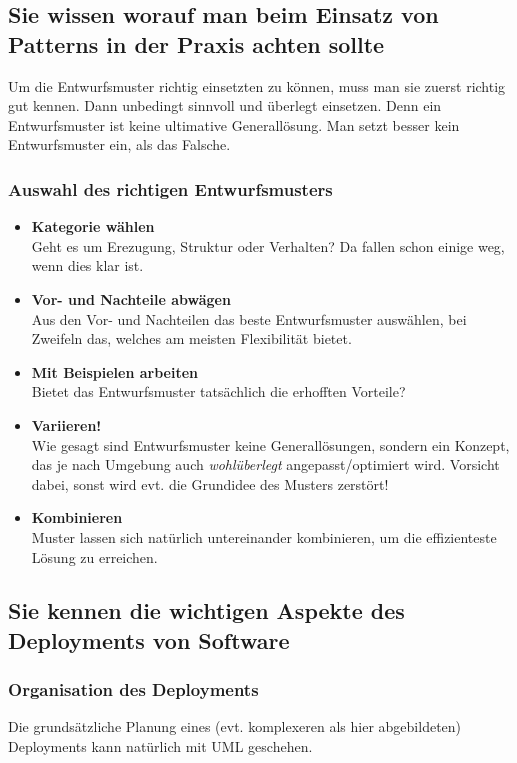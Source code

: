 \subsection{Sie wissen worauf man beim Einsatz von Patterns in der Praxis achten sollte}
Um die Entwurfsmuster richtig einsetzten zu können, muss man sie zuerst richtig gut kennen. Dann unbedingt sinnvoll und überlegt einsetzen. Denn ein Entwurfsmuster ist keine ultimative Generallösung. Man setzt besser kein Entwurfsmuster ein, als das Falsche.

\subsubsection{Auswahl des richtigen Entwurfsmusters}
\begin{itemize}
  \item \textbf{Kategorie wählen} \\
  Geht es um Erezugung, Struktur oder Verhalten? Da fallen schon einige weg, wenn dies klar ist.
  \item \textbf{Vor- und Nachteile abwägen} \\
  Aus den Vor- und Nachteilen das beste Entwurfsmuster auswählen, bei Zweifeln das, welches am meisten Flexibilität bietet.
  \item \textbf{Mit Beispielen arbeiten} \\
  Bietet das Entwurfsmuster tatsächlich die erhofften Vorteile?
  \item \textbf{Variieren!} \\
  Wie gesagt sind Entwurfsmuster keine Generallösungen, sondern ein Konzept, das je nach Umgebung auch \emph{wohlüberlegt} angepasst/optimiert wird. Vorsicht dabei, sonst wird evt. die Grundidee des Musters zerstört!
  \item \textbf{Kombinieren} \\
  Muster lassen sich natürlich untereinander kombinieren, um die effizienteste Lösung zu erreichen. 
\end{itemize}

\subsection{Sie kennen die wichtigen Aspekte des Deployments von Software}

\subsubsection{Organisation des Deployments}
Die grundsätzliche Planung eines (evt. komplexeren als hier abgebildeten) Deployments kann natürlich mit UML geschehen.


